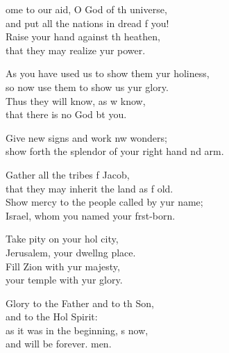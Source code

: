 \settowidth{\versewidth}{show forth the splendor of your right hand and arm.}
\begin{psalmverse}%
  \begin{patverse}
ome to our aid, O God of th universe,\Med\\
and put all the nations in dread f you!\\
Raise your hand against th heathen,\Med\\
that they may realize yur power.

As you have used us to show them yur holiness,\Med\\
so now use them to show us yur glory.\\
Thus they will know, as w know,\Med\\
that there is no God bt you.

Give new signs and work nw wonders;\Med\\
show forth the splendor of your right hand nd arm.

Gather all the tribes f Jacob,\Med\\
that they may inherit the land as f old.\\
Show mercy to the people called by yur name;\Med\\
Israel, whom you named your f\pointup{\i}rst-born.

Take pity on your hol city,\Med\\
Jerusalem, your dwell\pointup{\i}ng place.\\
Fill Zion with yur majesty,\Med\\
your temple with yur glory.

Glory to the Father and to th Son,\Med\\
and to the Hol Spirit:\\
as it was in the beginning, \pointup{\i}s now,\Med\\
and will be forever. men. 
  \end{patverse}
\end{psalmverse}
